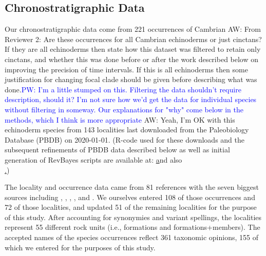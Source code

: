 \documentclass{article}
\newcommand{\amw}[1]{{\textcolor{OliveGreen}{AW: #1}}} %
\newcommand{\pjw}[1]{{\textcolor{blue}{PW: #1}}} %
\begin{document}
\subsection{Chronostratigraphic Data}
Our chronostratigraphic data come from 221 occurrences of Cambrian \amw{From Reviewer 2: Are these occurrences for all Cambrian echinoderms or just cinctans? If they are all echinoderms then state how this dataset was filtered to retain only cinctans, and whether this was done before or after the work described below on improving the precision of time intervals. If this is all echinoderms then some justification for changing focal clade should be given before describing what was done.}\pjw{I'm a little stumped on this. Filtering the data shouldn't require description, should it? I'm not sure how we'd get the data for individual species without filtering in someway. Our explanations for "why" come below in the methods, which I think is more appropriate} 
\amw{Yeah, I'm OK with this} echinoderm species from 143 localities last downloaded from the Paleobiology Database (PBDB) on 2020-01-01.  
(R-code used for these downloads and the subsequent refinements of PBDB data described below as well as initial generation of RevBayes scripts are available at: \href{http://github.com/PeterJWagner3/PaleoDB\_for\_RevBayes\_Webinar} and also \\ \href{http://paleobiodb.org/\#/resources}.)

The locality and occurrence data came from 81 references with the seven biggest sources including \citet{Nardin2017}, \citet{Zamora2009}, \citet{Chlupac1998}, \citet{Sprinkle2006}, \citet{Termier1973} and \citet{Sprinkle1973}. We ourselves entered 108 of those occurrences and 72 of those localities, and updated 51 of the remaining localities for the purpose of this study.  After accounting for synonymies and variant spellings, the localities represent 55 different rock units (i.e., formations and formations+members).  The accepted names of the species occurrences reflect 361 taxonomic opinions, 155 of which we entered for the purposes of this study.
\end{document}
